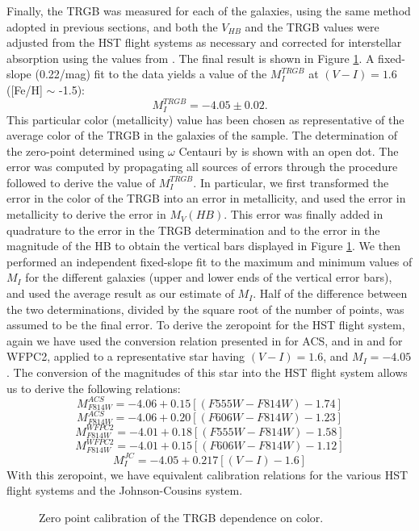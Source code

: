 \documentclass[11pt,preprint2]{aastex}
\begin{document}
Finally, the TRGB was measured for each of the galaxies, using the same method adopted in previous sections, and both the $V_{HB}$ and the TRGB values were adjusted from the HST flight systems as necessary and corrected for interstellar absorption using the values from \citet{1998ApJ...500..525S}. The final result is shown in Figure \ref{final_calib}. A fixed-slope (0.22/mag) fit to the data yields a value of the $M_I^{TRGB}$ at $(V-I)=1.6$ ([Fe/H] $\sim$ -1.5):
$$M_I^{TRGB}=-4.05 \pm 0.02.$$ This particular color (metallicity) value has been chosen as representative of the average color of the TRGB in the galaxies of the sample. The determination of the zero-point determined using $\omega$ Centauri by \citet{2001ApJ...556..635B} is shown with an open dot. The error was computed by propagating all sources of errors through the procedure followed to derive the value of $M_I^{TRGB}$. In particular, we first transformed the error in the color of the TRGB into an error in metallicity, and used the error in metallicity to derive the error in $M_V(HB)$. This error was finally added in quadrature to the error in the TRGB determination and to the error in the magnitude of the HB to obtain the vertical bars displayed in Figure \ref{final_calib}. We then performed an independent fixed-slope fit to the maximum and minimum values of $M_I$ for the different galaxies (upper and lower ends of the vertical error bars), and used the average result as our estimate of $M_I$. Half of the difference between the two determinations, divided by the square root of the number of points, was assumed to be the final error.
To derive the zeropoint for the HST flight system, again we have used the conversion relation presented in  \citet{2005PASP..117.1049S} for ACS, and in \citet{2000PASP..112.1397D} and \citet{1995PASP..107.1065H} for WFPC2, applied to a representative star having $(V-I)=1.6$, and $M_I=-4.05$.  The conversion of the magnitudes of this star into the HST flight system allows us to derive the following relations:
$$ M_{F814W}^{ACS}=-4.06+0.15[(F555W-F814W)-1.74]$$
$$ M_{F814W}^{ACS}=-4.06+0.20[(F606W-F814W)-1.23]$$
$$ M_{F814W}^{WFPC2}=-4.01+0.18[(F555W-F814W)-1.58]$$
$$ M_{F814W}^{WFPC2}=-4.01+0.15[(F606W-F814W)-1.12]$$
$$ M_I^{JC}=-4.05 + 0.217[(V-I)-1.6] $$ 
With this zeropoint, we have equivalent calibration relations for the various HST flight systems and the Johnson-Cousins system. 
\begin{figure}
\caption{Zero point calibration of the TRGB dependence on color. \label{final_calib}}
\end{figure}
\end{document}
